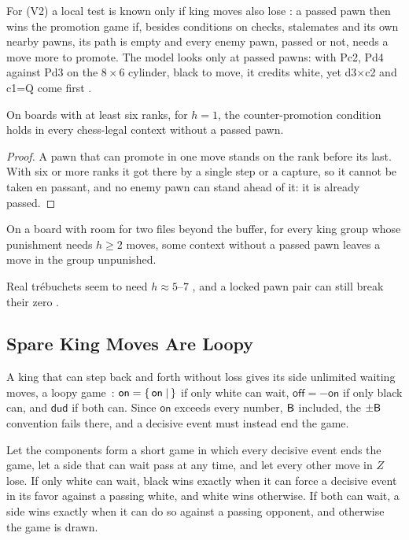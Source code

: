 For (V2) a local test is known only if king moves also lose : a passed pawn then wins the promotion
game if, besides conditions on checks, stalemates and its own nearby pawns, its path is empty and every enemy
pawn, passed or not, needs a move more to promote. The model looks only at passed pawns: with Pc2, Pd4 against
Pd3 on the $8\times6$ cylinder, black to move, it credits white, yet d3$\times$c2 and c1=Q come first .

\begin{proposition}[\lab{S}]\label{prop:horizon1}
On boards with at least six ranks, for $h=1$, the counter-promotion condition holds in every chess-legal
context without a passed pawn.
\end{proposition}

\begin{proof}
A pawn that can promote in one move stands on the rank before its last. With six or more ranks it got there by a
single step or a capture, so it cannot be taken en passant, and no enemy pawn can stand ahead of it: it is
already passed.
\end{proof}

\begin{conjecture}\label{conj:horizon2}
On a board with room for two files beyond the buffer, for every king group whose punishment needs $h\ge2$
moves, some context without a passed pawn leaves a move in the group unpunished.
\end{conjecture}

Real tr\'ebuchets seem to need $h\approx5$--$7$ , and a locked pawn pair can still break their zero .

\subsection{Spare King Moves Are Loopy}

A king that can step back and forth without loss gives its side unlimited waiting moves, a loopy
game~\cite{WinningWays,Siegel2013}: $\textsf{on}=\{\,\textsf{on} \mid \,\}$ if only white can wait,
$\textsf{off}=-\textsf{on}$ if only black can, and $\textsf{dud}$ if both can. Since $\textsf{on}$ exceeds every number, $\mathsf{B}$ included, the $\pm\mathsf{B}$ convention fails there, and a
decisive event must instead end the game.

\begin{theorem}\label{thm:loopy}
Let the components form a short game in which every decisive event ends the game, let a side that can wait pass
at any time, and let every other move in $Z$ lose. If only white can wait, black wins exactly when it can force a decisive
event in its favor against a passing white, and white wins otherwise. If both can wait, a side wins exactly when
it can do so against a passing opponent, and otherwise the game is drawn.
\end{theorem}

